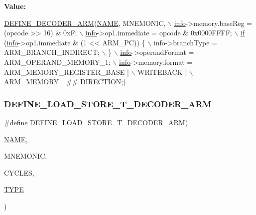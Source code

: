 {\bfseries Value\+:}
\begin{DoxyCode}
\mbox{\hyperlink{decoder-arm_8c_a4fe6e4683fda92c7774b0678f5ab95cc}{DEFINE\_DECODER\_ARM}}(\mbox{\hyperlink{inflate_8h_a164ea0159d5f0b5f12a646f25f99eceaa67bc2ced260a8e43805d2480a785d312}{NAME}}, MNEMONIC, \(\backslash\)
        \mbox{\hyperlink{libretro_8h_structretro__game__info}{info}}->memory.baseReg = (opcode >> 16) & 0xF; \(\backslash\)
        \mbox{\hyperlink{libretro_8h_structretro__game__info}{info}}->op1.immediate = opcode & 0x0000FFFF; \(\backslash\)
        \mbox{\hyperlink{isa-arm_8c_a0736bf8f9c6b829a423d7d7a43b781e8}{if}} (\mbox{\hyperlink{libretro_8h_structretro__game__info}{info}}->op1.immediate & (1 << ARM\_PC)) \{ \(\backslash\)
            info->branchType = ARM\_BRANCH\_INDIRECT; \(\backslash\)
        \} \(\backslash\)
        \mbox{\hyperlink{libretro_8h_structretro__game__info}{info}}->operandFormat = ARM\_OPERAND\_MEMORY\_1; \(\backslash\)
        \mbox{\hyperlink{libretro_8h_structretro__game__info}{info}}->memory.format = ARM\_MEMORY\_REGISTER\_BASE | \(\backslash\)
            WRITEBACK | \(\backslash\)
            ARM\_MEMORY\_ ## DIRECTION;)
\end{DoxyCode}
\mbox{\label{decoder-arm_8c_af75e93a1da66b50d8c742f497515aa20}} 
\subsubsection{\texorpdfstring{D\+E\+F\+I\+N\+E\+\_\+\+L\+O\+A\+D\+\_\+\+S\+T\+O\+R\+E\+\_\+\+T\+\_\+\+D\+E\+C\+O\+D\+E\+R\+\_\+\+A\+RM}{DEFINE\_LOAD\_STORE\_T\_DECODER\_ARM}}
{\footnotesize\ttfamily \#define D\+E\+F\+I\+N\+E\+\_\+\+L\+O\+A\+D\+\_\+\+S\+T\+O\+R\+E\+\_\+\+T\+\_\+\+D\+E\+C\+O\+D\+E\+R\+\_\+\+A\+RM(\begin{DoxyParamCaption}\item[{}]{\mbox{\hyperlink{inflate_8h_a164ea0159d5f0b5f12a646f25f99eceaa67bc2ced260a8e43805d2480a785d312}{N\+A\+ME}},  }\item[{}]{M\+N\+E\+M\+O\+N\+IC,  }\item[{}]{C\+Y\+C\+L\+ES,  }\item[{}]{\mbox{\hyperlink{inflate_8h_a164ea0159d5f0b5f12a646f25f99eceaab47ea8bb955afd0adc0ef98517dd6084}{T\+Y\+PE}} }\end{DoxyParamCaption})}


